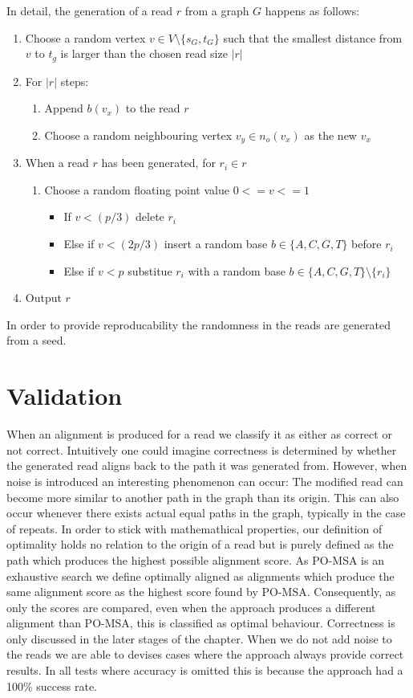 \documentclass[thesis.tex]{subfiles}
\begin{document}
\par\noindent
In detail, the generation of a read $r$ from a graph $G$ happens as follows: 
\begin{enumerate}
  \item Choose a random vertex $v \in V\setminus\{s_G, t_G\}$ such that the smallest distance from $v$ to $t_g$ is larger than the chosen read size $|r|$
  \item For $|r|$ steps:
  \begin{enumerate}
    \item Append $b(v_x)$ to the read $r$
    \item Choose a random neighbouring vertex $v_y \in n_o(v_x)$ as the new $v_x$
  \end{enumerate}
  \item When a read $r$ has been generated, for $r_i \in r$
  \begin{enumerate}
    \item Choose a random floating point value $0<=v<=1$
    \begin{itemize}
      \item If $v<(p/3)$ delete $r_i$
      \item Else if $v<(2p/3)$ insert a random base $b \in \{A, C, G, T\}$ before $r_i$
      \item Else if $v<p$ substitue $r_i$ with a random base $b \in \{A, C, G, T\}\setminus\{r_i\}$
    \end{itemize}
  \end{enumerate}
  \item Output $r$
\end{enumerate}
In order to provide reproducability the randomness in the reads are generated from a seed.\\
\section{Validation}
\label{sec:performance_validation}
When an alignment is produced for a read we classify it as either as correct or not correct. Intuitively one could imagine correctness is determined by whether the generated read aligns back to the path it was generated from. However, when noise is introduced an interesting phenomenon can occur: The modified read can become more similar to another path in the graph than its origin. This can also occur whenever there exists actual equal paths in the graph, typically in the case of repeats. In order to stick with mathemathical properties, our definition of optimality holds no relation to the origin of a read but is purely defined as the path which produces the highest possible alignment score. As PO-MSA is an exhaustive search we define optimally aligned as alignments which produce the same alignment score as the highest score found by PO-MSA. Consequently, as only the scores are compared, even when the approach produces a different alignment than PO-MSA, this is classified as optimal behaviour. Correctness is only discussed in the later stages of the chapter. When we do not add noise to the reads we are able to devises cases where the approach always provide correct results. In all tests where accuracy is omitted this is because the approach had a 100\% success rate.
\par\noindent
\end{document}
